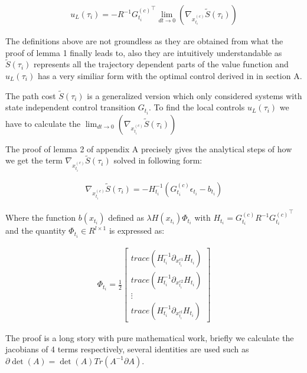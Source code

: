\documentclass[journal]{IEEEtran}
\begin{document}
\begin{equation}
  \begin{aligned}
    u_L(\tau_i) = -R^{-1} {G_{t_i}^{(c)}}^{\top} \lim_{dt\to 0 }(\nabla_{x_{t_i}^{(c)}}\tilde{S}(\tau_i))
  \end{aligned}
\end{equation}

The definitions above are not groundless as they are obtained from what the proof of lemma 1 finally leads to, also they are intuitively understandable
as $\tilde{S}(\tau_i)$ represents all the trajectory dependent parts of the value function and $u_L(\tau_i)$ has a very similiar form with the optimal control derived in
in section A.

The path cost $\tilde{S}(\tau_i)$ is a generalized version which only considered systems with state independent control transition $G_{t_i}$. To 
find the local controls $u_L(\tau_i)$ we have to calculate the $\lim_{dt\to 0 }(\nabla_{x_{t_i}^{(c)}}\tilde{S}(\tau_i))$

The proof of lemma 2 of appendix A precisely gives the analytical steps of how we get the term $\nabla_{x_{t_i}^{(c)}}\tilde{S}(\tau_i)$ solved in following form:

\begin{equation}
  \begin{aligned}
    \nabla_{x_{t_i}^{(c)}}\tilde{S}(\tau_i) = - H_{t_i}^{-1} (G_{t_i}^{(c)}\epsilon_{t_i} - b_{t_i})
  \end{aligned}
\end{equation}

Where the function $b(x_{t_i})$ defined as $\lambda H(x_{t_i})\Phi_{t_i}$ with $H_{t_i} = G_{t_i}^{(c)} R^{-1} {G_{t_i}^{(c)}}^{\top}$ and the quantity $\Phi_{t_i} \in R^{l \times 1}$
is expressed as:

\begin{equation}
  \begin{aligned}
  \Phi_{t_i} = \frac{1}{2} \begin{bmatrix} trace(H_{t_i}^{-1} \partial_{x_{t_i}^{c1}} H_{t_i}) \\trace(H_{t_i}^{-1} \partial_{x_{t_i}^{c2}} H_{t_i}) \\\vdots \\ trace(H_{t_i}^{-1} \partial_{x_{t_i}^{cl}} H_{t_i})\end{bmatrix} \nonumber 
  \end{aligned}
\end{equation}

The proof is a long story with pure mathematical work, briefly we calculate the jacobians of 4 terms respectively, several identities are used such as $\partial \det(A) = \det(A) Tr(A^{-1}\partial A )$. 
\end{document}
